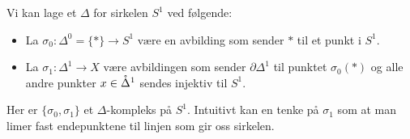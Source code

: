 \begin{eksempel}[ex:SirkelDkomp]
    Vi kan lage et $\Delta$ for sirkelen $S^1$ ved følgende:
    \begin{itemize}
        \item La $\sigma_0:\Delta^0=\{\ast\}\to S^1$ være en avbilding som sender $\ast$ til et punkt i $S^1$.
        \item La $\sigma_1: \Delta^1\to X$ være avbildingen som sender $\partial \Delta^1$ til punktet $\sigma_0(\ast)$ og alle andre punkter $x\in\mathring{\Delta}^1$ sendes injektiv til $S^1$.
    \end{itemize}
    Her er $\{\sigma_0,\sigma_1\}$ et $\Delta$-kompleks på $S^1$. Intuitivt kan en tenke på $\sigma_1$ som at man limer fast endepunktene til linjen som gir oss sirkelen.
\end{eksempel}

